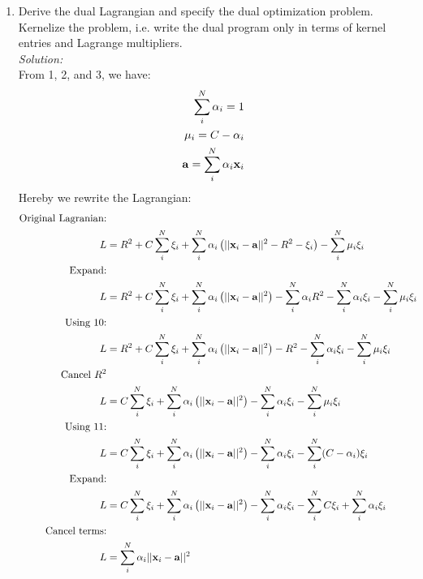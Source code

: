 \documentclass[12pt,a4paper]{article}
\newcommand{\lp}{\left(}
\newcommand{\rp}{\right)}
\newcommand{\xscalar}{x}
\newcommand{\xvec}{{\bf \xscalar}}
\newcommand{\avec}{\mathbf{a}}
\begin{document}
\begin{enumerate}
\item Derive the dual Lagrangian and specify the dual optimization problem. Kernelize the problem, i.e. write the dual program only in terms of kernel entries and Lagrange multipliers. \\
	\emph{Solution:} \\
		From 1, 2, and 3, we have:
			\begin{align}
			\sum_i^N \alpha_i = 1 \\
			\mu_i = C - \alpha_i \\
			\avec = \sum_i^N \alpha_i \xvec_i 
			\end{align}
		Hereby we rewrite the Lagrangian:
			\begin{align*}
			\text{Original Lagranian:} \\
			L &= R^2 + C \sum_i^N \xi_i + \sum_i^N \alpha_i \lp ||\xvec_i - \avec||^2 - R^2 - \xi_i \rp - \sum_i^N \mu_i \xi_i \\
			\text{Expand:} \\
			L &= R^2 + C \sum_i^N \xi_i + \sum_i^N \alpha_i \lp ||\xvec_i - \avec||^2 \rp - \sum_i^N \alpha_i R^2 - \sum_i^N \alpha_i \xi_i - \sum_i^N \mu_i \xi_i \\
			\text{Using 10:} \\
			L &= R^2 + C \sum_i^N \xi_i + \sum_i^N \alpha_i \lp ||\xvec_i - \avec||^2 \rp - R^2 - \sum_i^N \alpha_i \xi_i - \sum_i^N \mu_i \xi_i \\
			\text{Cancel } R^2 \\
			L &= C \sum_i^N \xi_i + \sum_i^N \alpha_i \lp ||\xvec_i - \avec||^2 \rp - \sum_i^N \alpha_i \xi_i - \sum_i^N \mu_i \xi_i \\
			\text{Using 11:} \\
			L &= C \sum_i^N \xi_i + \sum_i^N \alpha_i \lp ||\xvec_i - \avec||^2 \rp - \sum_i^N \alpha_i \xi_i - \sum_i^N (C - \alpha_i) \xi_i \\
			\text{Expand:} \\
			L &= C \sum_i^N \xi_i + \sum_i^N \alpha_i \lp ||\xvec_i - \avec||^2 \rp - \sum_i^N \alpha_i \xi_i - \sum_i^N C \xi_i + \sum_i^N \alpha_i \xi_i \\
			\text{Cancel terms:} \\
			L &= \sum_i^N \alpha_i ||\xvec_i - \avec||^2 \\
			\end{align*}
			

\end{enumerate}
\end{document}
